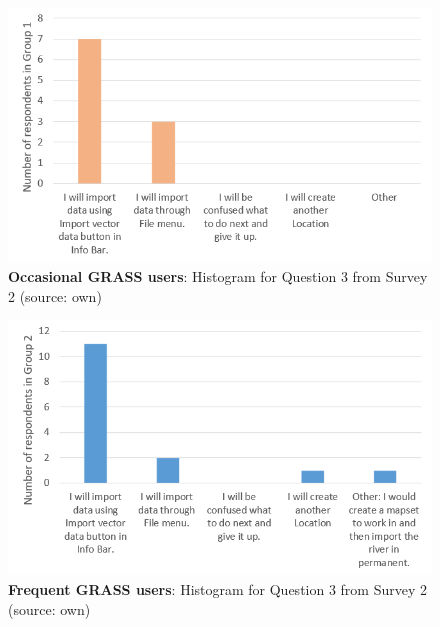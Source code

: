 \documentclass[a4paper,10pt,twoside]{article}
\begin{document}
\newpage
\vspace{0.3cm}
\begin{figure}[hbt!] 
\begin{center}
\includegraphics[width=14cm]{../surveys/analyzed_data/survey2_question3_histogram_group1.png}
\caption[\textbf{Occasional GRASS users}: Histogram for Question 3 from Survey 2]{\textbf{Occasional GRASS users}: Histogram for Question 3 from Survey 2 (source: own)}
\label{fig:survey2_question3_histogram_group1}
\end{center}
\end{figure}

\vspace{0.3cm}
\begin{figure}[hbt!]
\begin{center}
\includegraphics[width=14cm]{../surveys/analyzed_data/survey2_question3_histogram_group2.png} 
\caption[\textbf{Frequent GRASS users}: Histogram for Question 3 from Survey 2]{\textbf{Frequent GRASS users}: Histogram for Question 3 from Survey 2 (source: own)}
\label{fig:survey2_question3_histogram_group2}
\end{center}
\end{figure}
\end{document}

